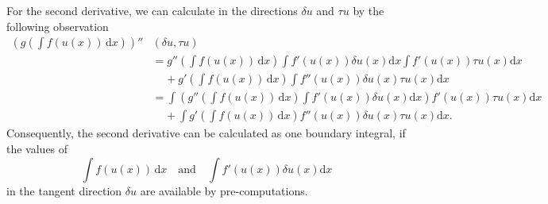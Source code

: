 For the second derivative, we can calculate in the directions $\delta u$ and $\tau u$
by the following observation 
\begin{align*}
 \left(g\left(\int f(u(x))\,\mathrm{d}x\right)\right)''&(\delta u,\tau u)\\
  &= g''(\int f(u(x))\,\mathrm{d}x) \int f'(u(x)) \delta u(x) \mathrm{d}x\int f'(u(x)) \tau u(x) \mathrm{d}x \\
  &\;\;\;\;+ g'(\int f(u(x))\,\mathrm{d}x) \int f''(u(x)) \delta u(x) \tau u(x) \mathrm{d}x \\
  &= \int \left(g''(\int f(u(x))\,\mathrm{d}x) \int f'(u(x)) \delta u(x) \mathrm{d}x\right)
 f'(u(x)) \tau u(x) \mathrm{d}x \\
 &\;\;\;\;+ \int g'(\int f(u(x))\,\mathrm{d}x)f''(u(x)) \delta u(x) \tau u(x) \mathrm{d}x.
\end{align*}
Consequently, the second derivative can be calculated as one boundary integral, if 
the values of 
\[
\int f(u(x))\,\mathrm{d}x \quad \text{and} \quad \int f'(u(x)) \delta u(x) \mathrm{d}x
\]
in the tangent direction $\delta u$ are available by pre-computations.

